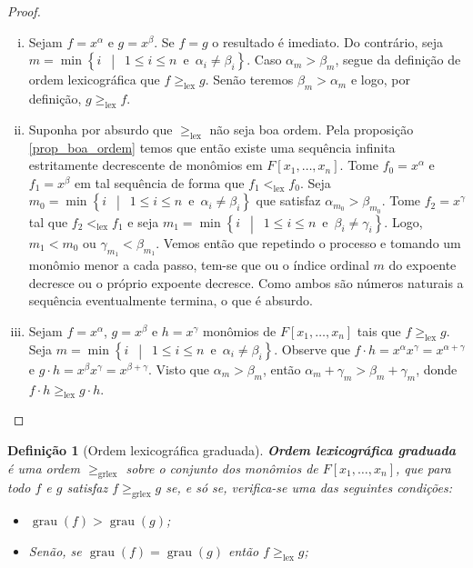 \documentclass[12pt,a4paper]{report}
\newcommand{\suchthat}{\enspace\middle|\enspace}
\newtheorem{definition}[theorem]{Definição}
\numberwithin{theorem}{chapter}
\DeclareMathOperator{\grau}{grau}
\begin{document}
\begin{proof}
  \begin{enumerate}[(i)]

  \item Sejam \(f = x^\alpha\) e \(g = x^\beta\).  Se \(f = g\) o
    resultado é imediato.  Do contrário, seja \(m = \min\left\{i
      \suchthat 1 \leq i \leq n \enspace\text{e}\enspace \alpha_i \neq
      \beta_i\right\}\).  Caso \(\alpha_m > \beta_m\), segue da
    definição de ordem lexicográfica que \(f \geq_{\text{lex}} g\).
    Senão teremos \(\beta_m > \alpha_m\) e logo, por definição, \(g
    \geq_{\text{lex}} f\).

  \item Suponha por absurdo que \(\geq_{\text{lex}}\) não seja boa
    ordem.  Pela proposição \ref{prop_boa_ordem} temos que então
    existe uma sequência infinita estritamente decrescente de monômios
    em \(F[x_1,\ldots,x_n]\).  Tome \(f_0 = x^\alpha\) e \(f_1 =
    x^\beta\) em tal sequência de forma que \(f_1 <_{\text{lex}}
    f_0\).  Seja \(m_0 = \min\left\{i \suchthat 1 \leq i \leq n
      \enspace\text{e}\enspace \alpha_i \neq \beta_i\right\}\) que
    satisfaz \(\alpha_{m_0} > \beta_{m_0}\).  Tome \(f_2 = x^\gamma\)
    tal que \(f_2 <_{\text{lex}} f_1\) e seja \(m_1 = \min\left\{i
      \suchthat 1 \leq i \leq n \enspace\text{e}\enspace \beta_i \neq
      \gamma_i\right\}\).  Logo, \(m_1 < m_0\) ou \(\gamma_{m_1} <
    \beta_{m_1}\).  Vemos então que repetindo o processo e tomando um
    monômio menor a cada passo, tem-se que ou o índice ordinal \(m\)
    do expoente decresce ou o próprio expoente decresce.  Como ambos
    são números naturais a sequência eventualmente termina, o que é
    absurdo.

  \item Sejam \(f = x^\alpha\), \(g = x^\beta\) e \(h = x^\gamma\)
    monômios de \(F[x_1,\ldots,x_n]\) tais que \(f \geq_{\text{lex}}
    g\).  Seja \(m = \min\left\{i \suchthat 1 \leq i \leq n
      \enspace\text{e}\enspace \alpha_i \neq
      \beta_i\right\}\). Observe que \(f \cdot h = x^\alpha x^\gamma =
    x^{\alpha+\gamma}\) e \(g \cdot h = x^\beta x^\gamma =
    x^{\beta+\gamma}\).  Visto que \(\alpha_m > \beta_m\), então
    \(\alpha_m+\gamma_m > \beta_m+\gamma_m\), donde \(f \cdot h
    \geq_{\text{lex}} g \cdot h\).

  \end{enumerate}
\end{proof}

\begin{definition}[Ordem lexicográfica graduada]
  \textbf{Ordem lexicográfica graduada} é uma ordem
  \(\geq_{\text{grlex}}\) sobre o conjunto dos monômios de
  \(F[x_1,\ldots,x_n]\), que para todo \(f\) e \(g\) satisfaz \(f
  \geq_{\text{grlex}} g\) se, e só se, verifica-se uma das seguintes
  condições:

  \begin{itemize}
  \item \(\grau(f) > \grau(g)\);
  \item Senão, se \(\grau(f) = \grau(g)\) então \(f \geq_{\text{lex}}
    g\);
  \end{itemize}
\end{definition}
\end{document}
